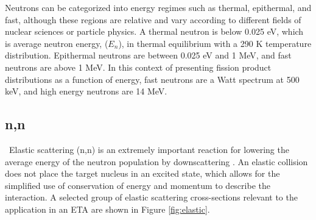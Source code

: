 Neutrons can be categorized into energy regimes such as thermal, epithermal, and fast, although these regions are relative and vary according to different fields of nuclear sciences or particle physics.  
A thermal neutron is below 0.025 eV, which is average neutron energy, ($E_{n}$), in thermal equilibrium with a 290 K temperature distribution\cite{Duderstadt}. 
Epithermal neutrons are between 0.025 eV and 1 MeV, and fast neutrons are above 1 MeV.
In this context of presenting fission product distributions as a function of energy, fast neutrons are a Watt spectrum at 500 keV, and high energy neutrons are 14 MeV. 




\subsection{n,n}

\ Elastic scattering (n,n) is an extremely important reaction for lowering the average energy of the neutron population by downscattering \cite{Turner}. 
An elastic collision does not place the target nucleus in an excited state, which allows for the simplified use of conservation of energy and momentum to describe the interaction. 
A selected group of elastic scattering cross-sections relevant to the application in an ETA are shown in Figure \ref{fig:elastic}. 

